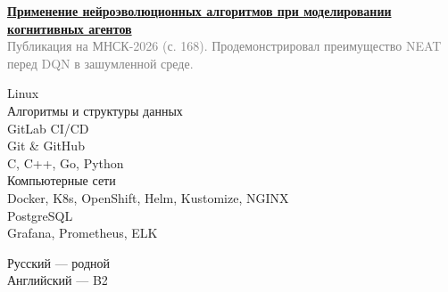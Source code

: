 \documentclass[10pt, a4paper]{article}
\begin{document}
\begin{minipage}[t]{0.4\textwidth}
\vspace{0.4cm}


\begin{minipage}[t]{\textwidth}
  \raggedright
  \large \href{https://www.nsu.ru/upload/iblock/826/371ay2z05ae8pdhbgjr5b14hcokg31t1/%D0%98%D0%A2_%D0%9D%D0%B0%D1%83%D1%87%D0%BD%D1%8B%D0%B9%20%D0%B8%D0%BD%D0%B6%D0%B8%D0%BD%D0%B8%D1%80%D0%B8%D0%BD%D0%B3.pdf}{\textbf{Применение нейроэволюционных алгоритмов при моделировании когнитивных агентов}}\extlink  \\[4pt]
  \small \textcolor{graytext}{Публикация на МНСК-2026 (с. 168). Продемонстрировал преимущество NEAT перед DQN в зашумленной среде.} \\
\end{minipage}

\vspace{0.4cm}

\begin{minipage}[t]{1\textwidth}
    \raggedright
    \small
    Linux \\[4pt]
    Алгоритмы и структуры данных \\[4pt]
    GitLab CI/CD \\[4pt]
    Git \& GitHub \\[4pt]
    C, C++, Go, Python \\[4pt]
    Компьютерные сети \\[4pt]
    Docker, K8s, OpenShift, Helm, Kustomize, NGINX \\[4pt]
    PostgreSQL \\[4pt]
    Grafana, Prometheus, ELK
\end{minipage}

\vspace{0.4cm}

Русский --- родной \\[4pt]
Английский --- B2


\end{minipage}
\end{document}
